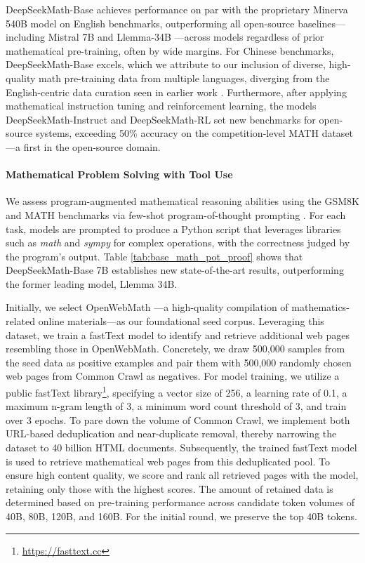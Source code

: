 \begin{itemize}[topsep=0pt]
    DeepSeekMath-Base achieves performance on par with the proprietary Minerva 540B \citep{minerva} model on English benchmarks, outperforming all open-source baselines—including Mistral 7B \citep{mistral} and Llemma-34B \citep{llemma}—across models regardless of prior mathematical pre-training, often by wide margins. For Chinese benchmarks, DeepSeekMath-Base excels, which we attribute to our inclusion of diverse, high-quality math pre-training data from multiple languages, diverging from the English-centric data curation seen in earlier work \citep{minerva,llemma}. Furthermore, after applying mathematical instruction tuning and reinforcement learning, the models DeepSeekMath-Instruct and DeepSeekMath-RL set new benchmarks for open-source systems, exceeding 50\% accuracy on the competition-level MATH dataset—a first in the open-source domain.
\end{itemize}

\paragraph{Mathematical Problem Solving with Tool Use} 
We assess program-augmented mathematical reasoning abilities using the GSM8K and MATH benchmarks via few-shot program-of-thought prompting \citep{pot,pal}. For each task, models are prompted to produce a Python script that leverages libraries such as \textit{math} and \textit{sympy} for complex operations, with the correctness judged by the program's output. Table \ref{tab:base_math_pot_proof} shows that DeepSeekMath-Base 7B establishes new state-of-the-art results, outperforming the former leading model, Llemma 34B.

Initially, we select OpenWebMath \citep{openwebmath}—a high-quality compilation of mathematics-related online materials—as our foundational seed corpus. Leveraging this dataset, we train a fastText model \citep{joulin2016fasttext} to identify and retrieve additional web pages resembling those in OpenWebMath. Concretely, we draw 500,000 samples from the seed data as positive examples and pair them with 500,000 randomly chosen web pages from Common Crawl as negatives. For model training, we utilize a public fastText library\footnote{\url{https://fasttext.cc}}, specifying a vector size of 256, a learning rate of 0.1, a maximum n-gram length of 3, a minimum word count threshold of 3, and train over 3 epochs. To pare down the volume of Common Crawl, we implement both URL-based deduplication and near-duplicate removal, thereby narrowing the dataset to 40 billion HTML documents. Subsequently, the trained fastText model is used to retrieve mathematical web pages from this deduplicated pool. To ensure high content quality, we score and rank all retrieved pages with the model, retaining only those with the highest scores. The amount of retained data is determined based on pre-training performance across candidate token volumes of 40B, 80B, 120B, and 160B. For the initial round, we preserve the top 40B tokens.

